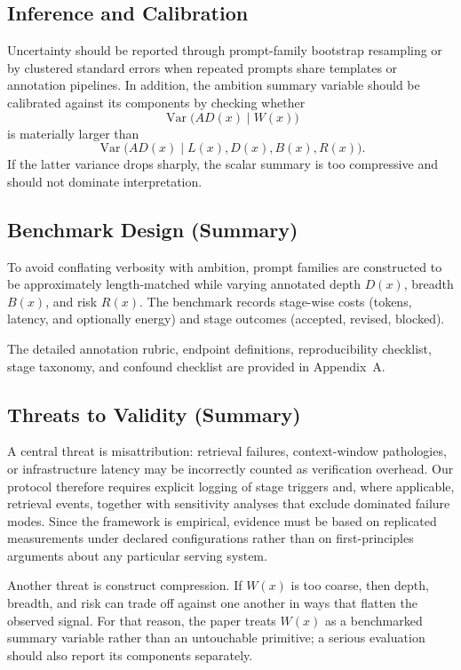\documentclass{svjour3}
\begin{document}
\subsection{Inference and Calibration}
Uncertainty should be reported through prompt-family bootstrap resampling or by clustered standard errors when repeated prompts share templates or annotation pipelines. In addition, the ambition summary variable should be calibrated against its components by checking whether
\[
\operatorname{Var}\!\bigl(AD(x)\mid W(x)\bigr)
\]
is materially larger than
\[
\operatorname{Var}\!\bigl(AD(x)\mid L(x),D(x),B(x),R(x)\bigr).
\]
If the latter variance drops sharply, the scalar summary is too compressive and should not dominate interpretation.

\subsection{Benchmark Design (Summary)}
To avoid conflating verbosity with ambition, prompt families are constructed to be approximately length-matched while varying annotated depth $D(x)$, breadth $B(x)$, and risk $R(x)$. The benchmark records stage-wise costs (tokens, latency, and optionally energy) and stage outcomes (accepted, revised, blocked).

The detailed annotation rubric, endpoint definitions, reproducibility checklist, stage taxonomy, and confound checklist are provided in Appendix~A.

\subsection{Threats to Validity (Summary)}
A central threat is misattribution: retrieval failures, context-window pathologies, or infrastructure latency may be incorrectly counted as verification overhead. Our protocol therefore requires explicit logging of stage triggers and, where applicable, retrieval events, together with sensitivity analyses that exclude dominated failure modes. Since the framework is empirical, evidence must be based on replicated measurements under declared configurations rather than on first-principles arguments about any particular serving system.

Another threat is construct compression. If $W(x)$ is too coarse, then depth, breadth, and risk can trade off against one another in ways that flatten the observed signal. For that reason, the paper treats $W(x)$ as a benchmarked summary variable rather than an untouchable primitive; a serious evaluation should also report its components separately.
\end{document}
